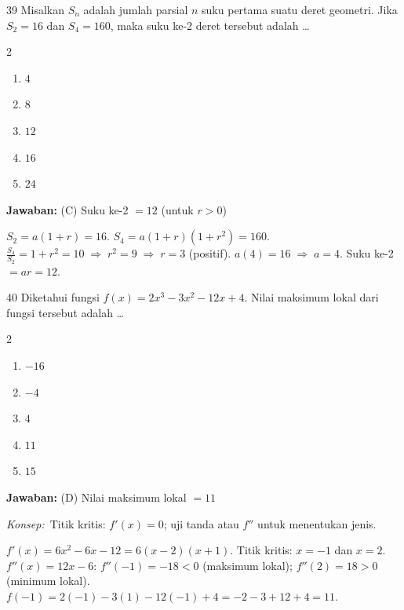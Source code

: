 \documentclass[11pt]{article}
\newcommand{\jawaban}[1]{%
  \noindent\colorbox{gold!30}{\parbox{\dimexpr\linewidth-2\fboxsep\relax}{%
    \textbf{Jawaban:} #1}}\par\smallskip}
\newcommand{\konsep}{\noindent\textit{Konsep:}\ \ignorespaces}
\newenvironment{pilB}{%
  \par\smallskip\begin{multicols}{2}
  \begin{enumerate}[label=(\Alph*),leftmargin=*,itemsep=1pt,topsep=3pt]}%
  {\end{enumerate}\end{multicols}}
\begin{document}
\begin{soal}{39}
Misalkan $S_n$ adalah jumlah parsial $n$ suku pertama suatu deret
geometri. Jika $S_2=16$ dan $S_4=160$, maka suku ke-2 deret
tersebut adalah \ldots
\begin{pilB}
  \item $4$ \item $8$ \item $12$ \item $16$ \item $24$
\end{pilB}
\end{soal}
\begin{pembox}
\jawaban{(C) Suku ke-2 $=12$ (untuk $r>0$)}
$S_2=a(1+r)=16$.\; $S_4=a(1+r)(1+r^2)=160$.
$\tfrac{S_4}{S_2}=1+r^2=10\;\Rightarrow\;r^2=9\;\Rightarrow\;r=3$ (positif).
$a(4)=16\;\Rightarrow\;a=4$. Suku ke-2 $=ar=12$.
\end{pembox}


\begin{soal}{40}
Diketahui fungsi $f(x)=2x^3-3x^2-12x+4$. Nilai maksimum lokal
dari fungsi tersebut adalah \ldots
\begin{pilB}
  \item $-16$ \item $-4$ \item $4$ \item $11$ \item $15$
\end{pilB}
\end{soal}
\begin{pembox}
\jawaban{(D) Nilai maksimum lokal $=11$}
\konsep Titik kritis: $f'(x)=0$; uji tanda atau $f''$ untuk menentukan jenis.

$f'(x)=6x^2-6x-12=6(x-2)(x+1)$.
Titik kritis: $x=-1$ dan $x=2$.
$f''(x)=12x-6$:\; $f''(-1)=-18<0$ (maksimum lokal);\; $f''(2)=18>0$ (minimum lokal).
$f(-1)=2(-1)-3(1)-12(-1)+4=-2-3+12+4=11$.
\end{pembox}
\end{document}
